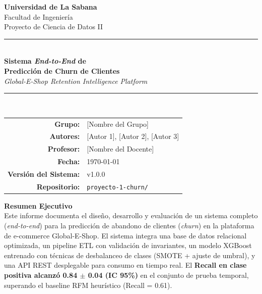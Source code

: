 \documentclass[12pt, letterpaper]{article}
\begin{document}
\begin{titlepage}
  \centering
  \vspace*{1cm}

  {\LARGE \textbf{Universidad de La Sabana}}\\[0.3cm]
  {\large Facultad de Ingeniería}\\[0.1cm]
  {\large Proyecto de Ciencia de Datos II}\\[2cm]

  {\rule{\linewidth}{0.5pt}}\\[0.4cm]
  {\Huge \textbf{Sistema \textit{End-to-End} de\\[0.2cm]
  Predicción de Churn de Clientes}}\\[0.3cm]
  {\Large \textit{Global-E-Shop Retention Intelligence Platform}}\\[0.3cm]
  {\rule{\linewidth}{0.5pt}}\\[1.5cm]

  \begin{tabular}{rl}
    \textbf{Grupo:}   & [Nombre del Grupo] \\[0.2cm]
    \textbf{Autores:} & [Autor 1], [Autor 2], [Autor 3] \\[0.2cm]
    \textbf{Profesor:} & [Nombre del Docente] \\[0.2cm]
    \textbf{Fecha:}   & \today \\[0.2cm]
    \textbf{Versión del Sistema:} & v1.0.0 \\[0.2cm]
    \textbf{Repositorio:} & \texttt{proyecto-1-churn/} \\
  \end{tabular}

  \vfill

  \begin{tcolorbox}[colback=retaingreen!10, colframe=retaingreen, width=0.85\textwidth]
    \centering
    \textbf{Resumen Ejecutivo}\\[0.3cm]
    Este informe documenta el diseño, desarrollo y evaluación de un sistema
    completo (\textit{end-to-end}) para la predicción de abandono de clientes
    (\textit{churn}) en la plataforma de e-commerce Global-E-Shop.
    El sistema integra una base de datos relacional optimizada, un pipeline
    ETL con validación de invariantes, un modelo XGBoost entrenado con técnicas
    de desbalanceo de clases (SMOTE + ajuste de umbral), y una API REST
    desplegable para consumo en tiempo real. El \textbf{Recall en clase positiva
    alcanzó 0.84 $\pm$ 0.04 (IC 95\%)} en el conjunto de prueba temporal,
    superando el baseline RFM heurístico (Recall = 0.61).
  \end{tcolorbox}
\end{titlepage}
\end{document}
